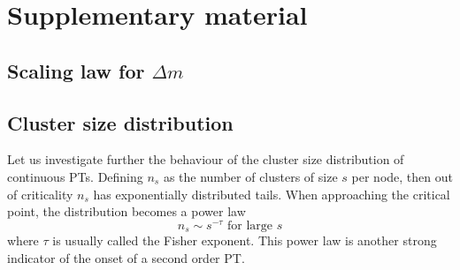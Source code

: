 \section{Supplementary material}
\subsection{Scaling law for $\Delta m$}
\label{par:scaling}

\subsection{Cluster size distribution}
Let us investigate further the behaviour of the cluster size distribution of continuous PTs. Defining $n_s$ as the number of clusters of size $s$ per node, then out of criticality $n_s$ has exponentially distributed tails. When approaching the critical point, the distribution becomes a power law
$$
n_s \sim s^{-\tau}  \mbox{ for large }s 
$$
where $\tau$ is usually called the Fisher exponent. This power law is another strong indicator of the onset of a second order PT.

